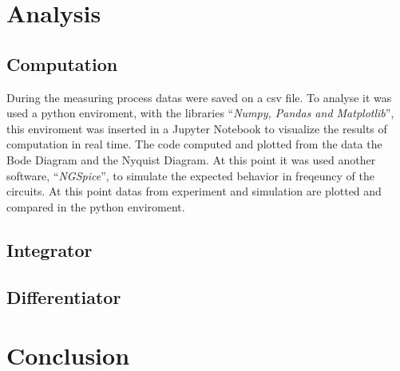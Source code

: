 \documentclass[a4paper,twocolumn]{article}
\begin{document}
\section{Analysis}

\subsection{Computation}

During the measuring process datas were saved on a csv file. To analyse  it was used a python enviroment, with the libraries ``\emph{Numpy, Pandas and Matplotlib}'', this enviroment was inserted in a Jupyter Notebook to visualize the results of computation in real time. The code computed and plotted from the data the Bode Diagram and the Nyquist Diagram. At this point it was used another software, ``\emph{NGSpice}'', to simulate the expected behavior in freqeuncy of the circuits. At this point datas from experiment and simulation are plotted and compared in the python enviroment.

\subsection{Integrator}

\subsection{Differentiator}

\section{Conclusion}
\end{document}
